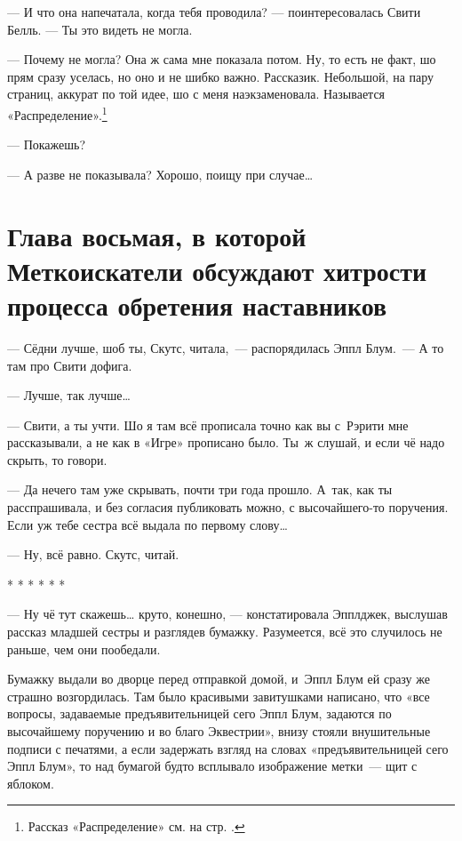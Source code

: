 \documentclass[fontsize=11pt,a5paper,titlepage=firstcover]{scrbook}
\begin{document}
--- И что она напечатала, когда тебя проводила? --- поинтересовалась Свити Белль. --- Ты это видеть не могла.

--- Почему не могла? Она ж сама мне показала потом. Ну, то есть не факт, шо прям сразу уселась, но оно и не шибко важно. Рассказик. Небольшой, на пару страниц, аккурат по той идее, шо с меня наэкзаменовала. Называется «Распределение».\footnote{Рассказ «Распределение» см. на стр. \pageref{raspredelenie}.}

--- Покажешь?

--- А разве не показывала? Хорошо, поищу при случае{\ldots}


\chapter*{Глава восьмая, в которой Меткоискатели обсуждают хитрости процесса обретения наставников}


--- Сёдни лучше, шоб ты, Скутс, читала,~--- распорядилась Эппл Блум.~--- А то там про Свити дофига.

--- Лучше, так лучше{\ldots}

--- Свити, а ты учти. Шо я там всё прописала точно как вы с~Рэрити мне рассказывали, а не как в «Игре» прописано было. Ты~ж слушай, и если чё надо скрыть, то говори.

--- Да нечего там уже скрывать, почти три года прошло. А~так, как ты расспрашивала, и без согласия публиковать можно, с высочайшего-то поручения. Если уж тебе сестра всё выдала по первому слову{\ldots}

--- Ну, всё равно. Скутс, читай.
\begin{center}* * * * * *\end{center}


--- Ну чё тут скажешь{\ldots} круто, конешно, --- констатировала Эпплджек, выслушав рассказ младшей сестры и разглядев бумажку. Разумеется, всё это случилось не раньше, чем они пообедали.

Бумажку выдали во дворце перед отправкой домой, и~Эппл Блум ей сразу же страшно возгордилась. Там было красивыми завитушками написано, что «все вопросы, задаваемые предъявительницей сего Эппл Блум, задаются по высочайшему поручению и во благо Эквестрии», внизу стояли внушительные подписи с печатями, а если задержать взгляд на словах «предъявительницей сего Эппл Блум», то над бумагой будто всплывало изображение метки~--- щит с яблоком.
\end{document}
